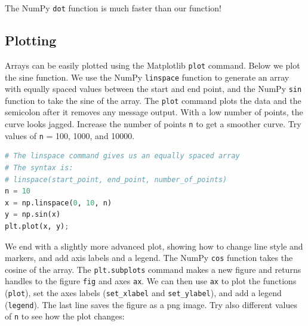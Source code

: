 \documentclass[a4paper , 12pt]{book}
\newcommand{\code}[1]{\colorbox{light-gray}{\texttt{#1}}}
\begin{document}
The NumPy \code{dot} function is much faster than our function!

\subsection{Plotting}

Arrays can be easily plotted using the Matplotlib \code{plot} command. Below we plot the sine function. We use the NumPy \code{linspace} function to generate an array with equally spaced values between the start and end point, and the NumPy \code{sin} function to take the sine of the array. The \code{plot} command plots the data and the semicolon after it removes any message output. With a low number of points, the curve looks jagged. Increase the number of points \code{n} to get a smoother curve. Try values of \code{n} = 100, 1000, and 10000.

\begin{center}
\begin{lstlisting}[language=Python, frame=single]
# The linspace command gives us an equally spaced array
# The syntax is: 
# linspace(start_point, end_point, number_of_points)
n = 10
x = np.linspace(0, 10, n)
y = np.sin(x)
plt.plot(x, y);
\end{lstlisting}
\end{center}

We end with a slightly more advanced plot, showing how to change line style and markers, and add axis labels and a legend. The NumPy \code{cos} function takes the cosine of the array. The \code{plt.subplots} command makes a new figure and returns handles to the figure \code{fig} and axes \code{ax}. We can then use \code{ax} to plot the functions (\code{plot}), set the axes labels (\code{set\_xlabel} and \code{set\_ylabel}), and add a legend (\code{legend}). The last line saves the figure as a png image. Try also different values of \code{n} to see how the plot changes:
\end{document}
